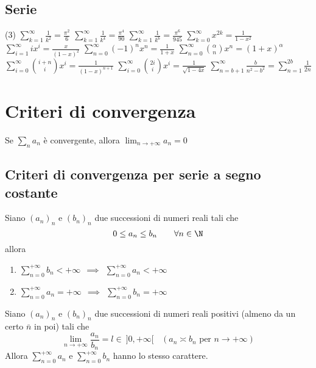 \subsection{Serie}
\begin{tasks}[label=\textbullet](3)
    \task  $\sum^{\infty}_{k=1} \frac{1}{k^2}=\frac{\pi^2}{6}$
    \task $\sum^{\infty}_{k=1} \frac{1}{k^4}=\frac{\pi^4}{90}$
    \task $\sum^{\infty}_{k=1} \frac{1}{k^6}=\frac{\pi^6}{945}$
    \task $\sum_{k=0}^\infty x^{2k}= \frac{1}{1-x^2}$
    \task $\sum_{i=1}^\infty i x^i = \frac{x}{(1-x)^2}$
    \task $\sum_{n=0}^\infty (-1)^n x^n = \frac{1}{1+x}$
    \task $ \sum_{n=0}^\infty {\alpha \choose n} x^n = (1+x)^\alpha$
    \task $\sum_{i=0}^\infty {i+n \choose i} x^i = \frac{1}{(1-x)^{n+1}}$
    \task $\sum_{i=0}^\infty {2i \choose i} x^i = \frac{1}{\sqrt{1-4x}}$
    \task $\sum_{n=b+1}^{\infty} \frac{b}{n^2 - b^2} = \sum_{n=1}^{2b} \frac{1}{2n}$
\end{tasks}

\section{Criteri di convergenza}
\begin{shadedTheorem}
        Se $\sum_na_n$ è convergente, allora $\lim_{n\to+\infty}a_n=0$
\end{shadedTheorem}
\subsection{Criteri di convergenza per serie a segno costante}
\begin{shadedTheorem}[Confronto]
    Siano $(a_n)_n$ e $(b_n)_n$ due successioni di numeri reali tali che 
    \[0\leq a_n\leq b_n~~~~~~\forall n\in \N\]
    allora
    \begin{enumerate}[label=\roman*\:\textnormal{)},itemindent=*]
        \item $\sum_{n=0}^{+\infty}b_n<+\infty~~\implies~~\sum_{n=0}^{+\infty}a_n<+\infty$
        \item $\sum_{n=0}^{+\infty}a_n=+\infty~~\implies~~\sum_{n=0}^{+\infty}b_n=+\infty$
    \end{enumerate}
\end{shadedTheorem}

\begin{shadedTheorem}
    Siano $(a_n)_n$ e $(b_n)_n$ due successioni di numeri reali positivi (almeno da un certo $\bar{n}$ in poi) tali che 
    \[\lim_{n\to +\infty}\frac{a_n}{b_n}=l\in \:]0,+\infty[~~~~\left( a_n\asymp b_n \text{ per } n\to+\infty \right)\]
    Allora $\sum_{n=0}^{+\infty}a_n$ e $\sum_{n=0}^{+\infty}b_n$ hanno lo stesso carattere.
\end{shadedTheorem}

